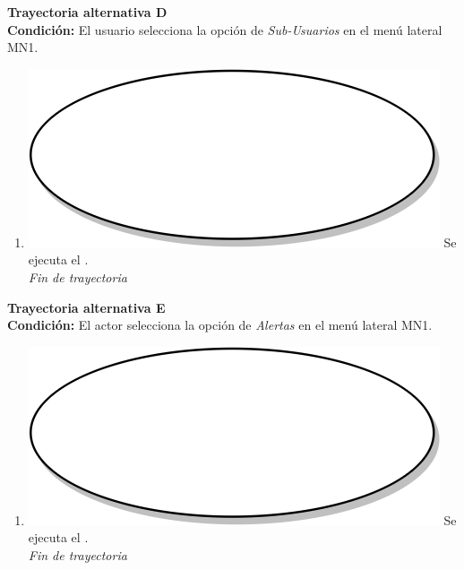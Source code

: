 \textbf{Trayectoria alternativa D} \label{cu3_ta_d} \\
\textbf{Condición:} El usuario selecciona la opción de \textit{Sub-Usuarios} en el menú lateral MN1. \\
 \begin{enumerate}[label=D\arabic*]
    \item {\includegraphics[scale=.05]{Capitulo3/img/proceso.png} Se ejecuta el \textbf{}.} \\
    \textit{Fin de trayectoria} \\
\end{enumerate}

\textbf{Trayectoria alternativa E} \label{cu3_ta_e} \\
\textbf{Condición:} El actor selecciona la opción de \textit{Alertas} en el menú lateral MN1. \\
 \begin{enumerate}[label=E\arabic*]
    \item {\includegraphics[scale=.05]{Capitulo3/img/proceso.png} Se ejecuta el \textbf{}.} \\
    \textit{Fin de trayectoria} \\
\end{enumerate}

